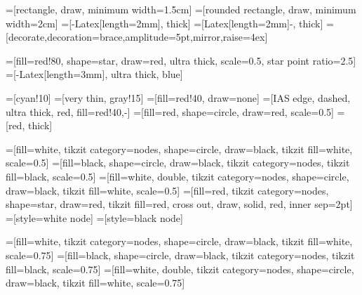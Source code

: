 

=[rectangle, draw, minimum width=1.5cm]
=[rounded rectangle, draw, minimum width=2cm]
=[-{Latex[length=2mm]}, thick]
=[{Latex[length=2mm]}-, thick]
=[decorate,decoration={brace,amplitude=5pt,mirror,raise=4ex}]

=[fill=red!80, shape=star, draw=red, ultra thick, scale=0.5, star point ratio=2.5]
=[-{Latex[length=3mm]}, ultra thick, blue]

=[cyan!10]
=[very thin, gray!15]
=[fill=red!40, draw=none]
=[IAS edge, dashed, ultra thick, red, fill=red!40,-]
=[fill=red, shape=circle, draw=red, scale=0.5]
=[red, thick]

=[fill=white, tikzit category=nodes, shape=circle, draw=black, tikzit fill=white, scale=0.5]
=[fill=black, shape=circle, draw=black, tikzit category=nodes, tikzit fill=black, scale=0.5]
=[fill=white, double, tikzit category=nodes, shape=circle, draw=black, tikzit fill=white, scale=0.5]
=[fill=red, tikzit category=nodes, shape=star, draw=red, tikzit fill=red, cross out, draw, solid, red, inner sep=2pt]
=[style=white node]
=[style=black node]

=[fill=white, tikzit category=nodes, shape=circle, draw=black, tikzit fill=white, scale=0.75]
=[fill=black, shape=circle, draw=black, tikzit category=nodes, tikzit fill=black, scale=0.75]
=[fill=white, double, tikzit category=nodes, shape=circle, draw=black, tikzit fill=white, scale=0.75]

